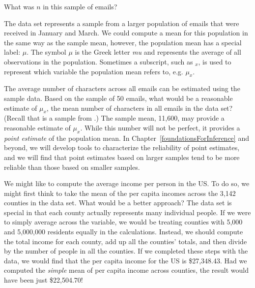 \begin{exercisewrap}
\begin{nexercise}
What was $n$ in this sample of emails?\footnotemark
\end{nexercise}
\end{exercisewrap}

The  data set represents a sample from a larger population of emails that were received in January and March. We could compute a mean for this population in the same way as the sample mean, however, the population mean has a special label: $\mu$.  The symbol $\mu$ is the Greek letter \emph{mu} and represents the average of all observations in the population. Sometimes a subscript, such as $_x$, is used to represent which variable the population mean refers to, e.g. $\mu_x$.

\begin{examplewrap}
\begin{nexample}{The average number of characters across all emails can be estimated using the sample data. Based on the sample of 50 emails, what would be a reasonable estimate of $\mu_x$, the mean number of characters in all emails in the  data set? (Recall that  is a sample from .)}
The sample mean, 11,600, may provide a reasonable estimate of $\mu_x$. While this number will not be perfect, it provides a \emph{point estimate} of the population mean. In Chapter~\ref{foundationsForInference} and beyond, we will develop tools to characterize the reliability of point estimates, and we will find that point estimates based on larger samples tend to be more reliable than those based on smaller samples.
\end{nexample}
\end{examplewrap}

\begin{examplewrap}
\begin{nexample}{We might like to compute the average income per person in the US. To do so, we might first think to take the mean of the per capita incomes across the 3,142 counties in the  data set. What would be a better approach?} \label{wtdMeanOfIncome}
The  data set is special in that each county actually represents many individual people. If we were to simply average across the  variable, we would be treating counties with 5,000 and 5,000,000 residents equally in the calculations. Instead, we should compute the total income for each county, add up all the counties' totals, and then divide by the number of people in all the counties. If we completed these steps with the  data, we would find that the per capita income for the US is \$27,348.43. Had we computed the \emph{simple} mean of per capita income across counties, the result would have been just \$22,504.70!
\end{nexample}
\end{examplewrap}

